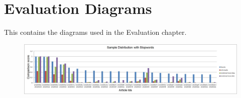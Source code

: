 \chapter{Evaluation Diagrams}
This contains the diagrams used in the Evaluation chapter.

\begin{figure}
	\centering
	\includegraphics[scale=0.45]{figures/JPPOLScoreGraph}
	\label{D1}
\end{figure}